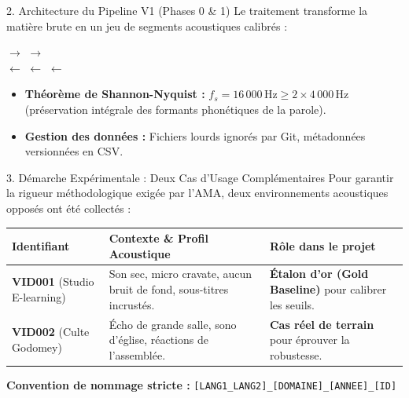 \documentclass[aspectratio=169,10pt]{beamer}
\begin{document}
\begin{frame}{2. Architecture du Pipeline V1 (Phases 0 \& 1)}
Le traitement transforme la matière brute en un jeu de segments acoustiques calibrés :
\vspace{0.3cm}
\begin{center}
\small
{}
$\longrightarrow$
$\longrightarrow$
 \\
\vspace{0.4cm}
$\longleftarrow$
$\longleftarrow$
$\longleftarrow$
\end{center}

\vspace{0.4cm}
\begin{itemize}
    \item \textbf{Théorème de Shannon-Nyquist :} $f_s = 16\,000\,\text{Hz} \ge 2 \times 4\,000\,\text{Hz}$ (préservation intégrale des formants phonétiques de la parole).
    \item \textbf{Gestion des données :} Fichiers lourds ignorés par Git, métadonnées versionnées en CSV.
\end{itemize}
\end{frame}

\begin{frame}{3. Démarche Expérimentale : Deux Cas d'Usage Complémentaires}
Pour garantir la rigueur méthodologique exigée par l'AMA, deux environnements acoustiques opposés ont été collectés :

\vspace{0.2cm}
\begin{table}[h]
\centering
\footnotesize
\begin{tabular}{p{3.2cm}p{5.0cm}p{3.5cm}}
\toprule
\textbf{Identifiant} & \textbf{Contexte \& Profil Acoustique} & \textbf{Rôle dans le projet} \\
\midrule
\textbf{VID001} (Studio E-learning) & Son sec, micro cravate, aucun bruit de fond, sous-titres incrustés. & \textbf{Étalon d'or (Gold Baseline)} pour calibrer les seuils. \\
\addlinespace
\textbf{VID002} (Culte Godomey) & Écho de grande salle, sono d'église, réactions de l'assemblée. & \textbf{Cas réel de terrain} pour éprouver la robustesse. \\
\bottomrule
\end{tabular}
\end{table}

\vspace{0.2cm}
\textbf{Convention de nommage stricte :} \texttt{[LANG1\_LANG2]\_[DOMAINE]\_[ANNEE]\_[ID]}
\end{frame}
\end{document}
